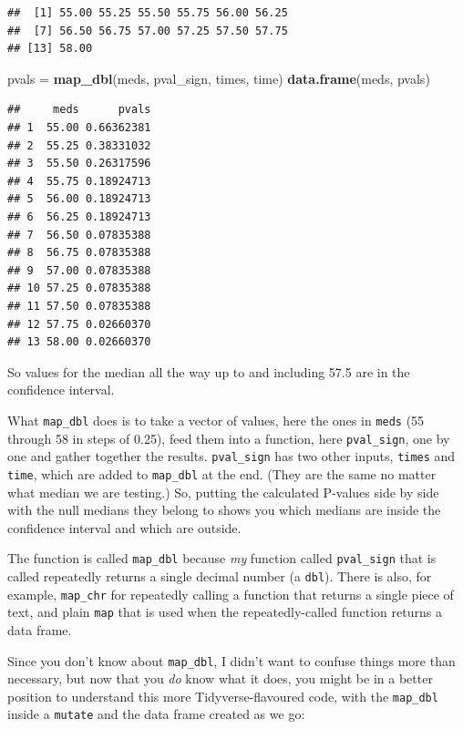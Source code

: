 \documentclass[]{tufte-book}
\newenvironment{Shaded}{}{}
\newcommand{\KeywordTok}[1]{\textcolor[rgb]{0.00,0.44,0.13}{\textbf{#1}}}
\newcommand{\NormalTok}[1]{#1}
\newcommand{\StringTok}[1]{\textcolor[rgb]{0.25,0.44,0.63}{#1}}
\theoremstyle{definition}
\theoremstyle{definition}
\theoremstyle{definition}
\theoremstyle{remark}
\begin{document}
\begin{verbatim}
##  [1] 55.00 55.25 55.50 55.75 56.00 56.25
##  [7] 56.50 56.75 57.00 57.25 57.50 57.75
## [13] 58.00
\end{verbatim}

\begin{Shaded}
\begin{Highlighting}[]
\NormalTok{pvals =}\StringTok{ }\KeywordTok{map_dbl}\NormalTok{(meds, pval_sign, times, time)}
\KeywordTok{data.frame}\NormalTok{(meds, pvals)}
\end{Highlighting}
\end{Shaded}

\begin{verbatim}
##     meds      pvals
## 1  55.00 0.66362381
## 2  55.25 0.38331032
## 3  55.50 0.26317596
## 4  55.75 0.18924713
## 5  56.00 0.18924713
## 6  56.25 0.18924713
## 7  56.50 0.07835388
## 8  56.75 0.07835388
## 9  57.00 0.07835388
## 10 57.25 0.07835388
## 11 57.50 0.07835388
## 12 57.75 0.02660370
## 13 58.00 0.02660370
\end{verbatim}

So values for the median all the way up to and including 57.5 are in the
confidence interval.

What \texttt{map\_dbl} does is to take a vector of values, here the ones
in \texttt{meds} (55 through 58 in steps of 0.25), feed them into a
function, here \texttt{pval\_sign}, one by one and gather together the
results. \texttt{pval\_sign} has two other inputs, \texttt{times} and
\texttt{time}, which are added to \texttt{map\_dbl} at the end. (They
are the same no matter what median we are testing.) So, putting the
calculated P-values side by side with the null medians they belong to
shows you which medians are inside the confidence interval and which are
outside.

The function is called \texttt{map\_dbl} because \emph{my} function
called \texttt{pval\_sign} that is called repeatedly returns a single
decimal number (a \texttt{dbl}). There is also, for example,
\texttt{map\_chr} for repeatedly calling a function that returns a
single piece of text, and plain \texttt{map} that is used when the
repeatedly-called function returns a data frame.

Since you don't know about \texttt{map\_dbl}, I didn't want to confuse
things more than necessary, but now that you \emph{do} know what it
does, you might be in a better position to understand this more
Tidyverse-flavoured code, with the \texttt{map\_dbl} inside a
\texttt{mutate} and the data frame created as we go:
\end{document}
